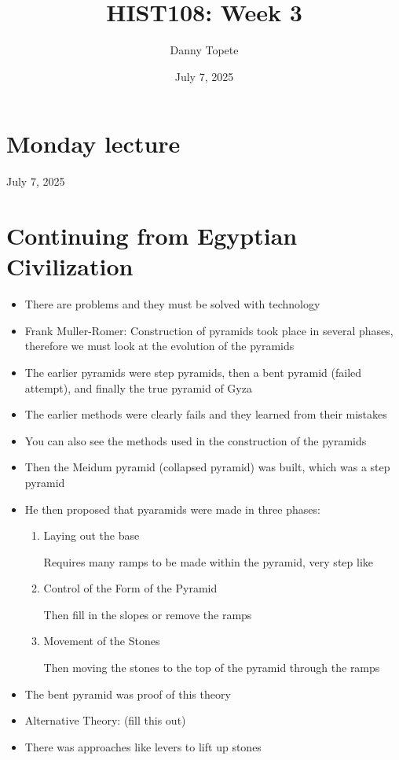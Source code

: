 \documentclass{article}
\title{HIST108: Week 3}
\author{Danny Topete}
\date{July 7, 2025}
\begin{document}
\maketitle

\section*{Monday lecture}
July 7, 2025

\section{Continuing from Egyptian Civilization}
\begin{itemize}
  \item There are problems and they must be solved with technology
  \item Frank Muller-Romer: Construction of pyramids took place in several phases,
    therefore we must look at the evolution of the pyramids
  \item The earlier pyramids were step pyramids, then a bent pyramid (failed attempt), and finally the true pyramid of Gyza
  \item The earlier methods were clearly fails and they learned from their mistakes
  \item You can also see the methods used in the construction of the pyramids
  \item Then the Meidum pyramid (collapsed pyramid) was built, which was a step pyramid
  \item He then proposed that pyaramids were made in three phases:
    \begin{enumerate}
      \item Laying out the base

        Requires many ramps to be made within the pyramid,
        very step like
      \item Control of the Form of the Pyramid

        Then fill in the slopes or remove the ramps
      \item Movement of the Stones

        Then moving the stones to the top of the pyramid through the ramps
    \end{enumerate}
  \item The bent pyramid was proof of this theory
  \item Alternative Theory: (fill this out)
  \item There was approaches like levers to lift up stones
\end{itemize}
\end{document}
